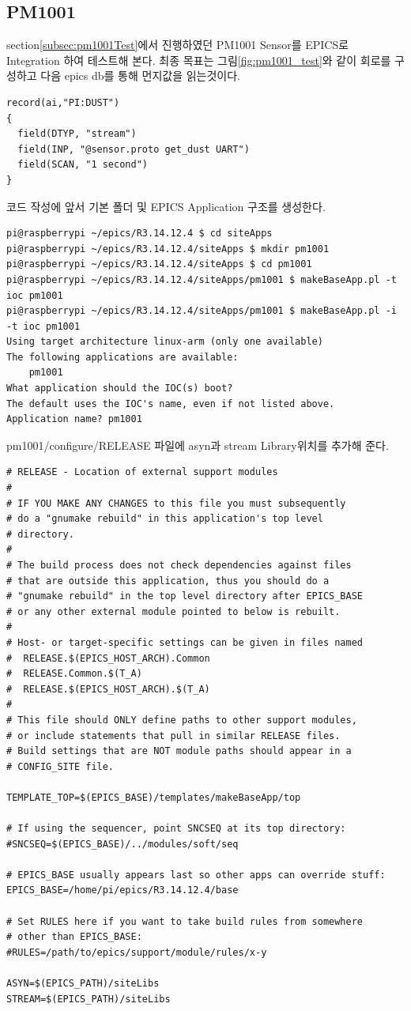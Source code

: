 \documentclass[11pt
  , a4paper
  , article
  , oneside
]{memoir}
\begin{document}
\subsection{PM1001}
section\ref{subsec:pm1001Test}에서 진행하였던 PM1001 Sensor를 EPICS로 Integration 하여 테스트해 본다.
최종 목표는 그림\ref{fig:pm1001_test}와 같이 회로를 구성하고 다음 epics db를 통해 먼지값을 읽는것이다.
\begin{lstlisting}[style=termstyle]
record(ai,"PI:DUST")
{
  field(DTYP, "stream")
  field(INP, "@sensor.proto get_dust UART")
  field(SCAN, "1 second")
}
\end{lstlisting}
코드 작성에 앞서 기본 폴더 및 EPICS Application 구조를 생성한다.
\begin{lstlisting}[style=termstyle]
pi@raspberrypi ~/epics/R3.14.12.4 $ cd siteApps
pi@raspberrypi ~/epics/R3.14.12.4/siteApps $ mkdir pm1001
pi@raspberrypi ~/epics/R3.14.12.4/siteApps $ cd pm1001
pi@raspberrypi ~/epics/R3.14.12.4/siteApps/pm1001 $ makeBaseApp.pl -t ioc pm1001
pi@raspberrypi ~/epics/R3.14.12.4/siteApps/pm1001 $ makeBaseApp.pl -i -t ioc pm1001
Using target architecture linux-arm (only one available)
The following applications are available:
    pm1001
What application should the IOC(s) boot?
The default uses the IOC's name, even if not listed above.
Application name? pm1001
\end{lstlisting}
pm1001/configure/RELEASE 파일에 asyn과 stream Library위치를 추가해 준다.
\begin{lstlisting}[style=termstyle]
# RELEASE - Location of external support modules
#
# IF YOU MAKE ANY CHANGES to this file you must subsequently
# do a "gnumake rebuild" in this application's top level
# directory.
#
# The build process does not check dependencies against files
# that are outside this application, thus you should do a
# "gnumake rebuild" in the top level directory after EPICS_BASE
# or any other external module pointed to below is rebuilt.
#
# Host- or target-specific settings can be given in files named
#  RELEASE.$(EPICS_HOST_ARCH).Common
#  RELEASE.Common.$(T_A)
#  RELEASE.$(EPICS_HOST_ARCH).$(T_A)
#
# This file should ONLY define paths to other support modules,
# or include statements that pull in similar RELEASE files.
# Build settings that are NOT module paths should appear in a
# CONFIG_SITE file.

TEMPLATE_TOP=$(EPICS_BASE)/templates/makeBaseApp/top

# If using the sequencer, point SNCSEQ at its top directory:
#SNCSEQ=$(EPICS_BASE)/../modules/soft/seq

# EPICS_BASE usually appears last so other apps can override stuff:
EPICS_BASE=/home/pi/epics/R3.14.12.4/base

# Set RULES here if you want to take build rules from somewhere
# other than EPICS_BASE:
#RULES=/path/to/epics/support/module/rules/x-y

ASYN=$(EPICS_PATH)/siteLibs
STREAM=$(EPICS_PATH)/siteLibs
\end{lstlisting}
\end{document}
